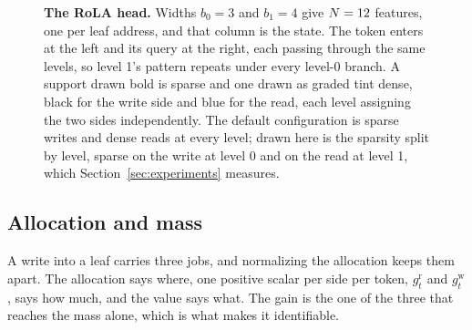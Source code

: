 \begin{figure}[H]
\caption{\textbf{The RoLA head.} Widths $b_0 = 3$ and $b_1 = 4$ give $N = 12$ features, one per leaf address, and that column is the state. The token enters at the left and its query at the right, each passing through the same levels, so level 1's pattern repeats under every level-0 branch. A support drawn bold is sparse and one drawn as graded tint dense, black for the write side and blue for the read, each level assigning the two sides independently. The default configuration is sparse writes and dense reads at every level; drawn here is the sparsity split by level, sparse on the write at level 0 and on the read at level 1, which Section~\ref{sec:experiments} measures.}
\label{fig:head}
\end{figure}

\subsection{Allocation and mass}
\label{sec:allocation}

A write into a leaf carries three jobs, and normalizing the allocation keeps them apart. The allocation says where, one positive scalar per side per token, $g^{\mathrm{r}}_t$ and $g^{\mathrm{w}}_t$, says how much, and the value says what. The gain is the one of the three that reaches the mass alone, which is what makes it identifiable.

